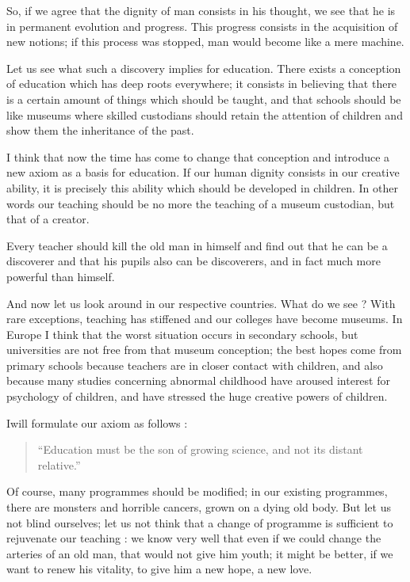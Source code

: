 So, if we agree that the dignity of man consists in his thought, we see that he is in permanent evolution and progress. This progress consists in the acquisition of new notions; if this process was stopped, man would become like a mere machine.

Let us see what such a discovery implies for education. There exists a conception of education which has deep roots everywhere; it consists in believing that there is a certain amount of things which should be taught, and that schools should be like museums where skilled custodians should retain the attention of children and show them the inheritance of the past.

I think that now the time has come to change that conception and introduce a new axiom as a basis for education. If our human dignity consists in our creative ability, it is precisely this ability which should be developed in children. In other words our teaching should be no more the teaching of a museum custodian, but that of a creator.

Every teacher should kill the old man in himself and find out that he can be a discoverer and that his pupils also can be discoverers, and in fact much more powerful than himself.

And now let us look around in our respective countries. What do we see ? With rare exceptions, teaching has stiffened and our colleges have become museums. In Europe I think that the worst situation occurs in secondary schools, but universities are not free from that museum conception; the best hopes come from primary schools because teachers are in closer contact with children, and also because many studies concerning abnormal childhood have aroused interest for psychology of children, and have stressed the huge creative powers of children.

I\pageoriginale will formulate our axiom as follows :
\begin{quote}
``Education must be the son of growing science, and not its distant relative.''
\end{quote}

Of course, many programmes should be modified; in our existing programmes, there are monsters and horrible cancers, grown on a dying old body. But let us not blind ourselves; let us not think that a change of programme is sufficient to rejuvenate our teaching : we know very well that even if we could change the arteries of an old man, that would not give him youth; it might be better, if we want to renew his vitality, to give him a new hope, a new love.

